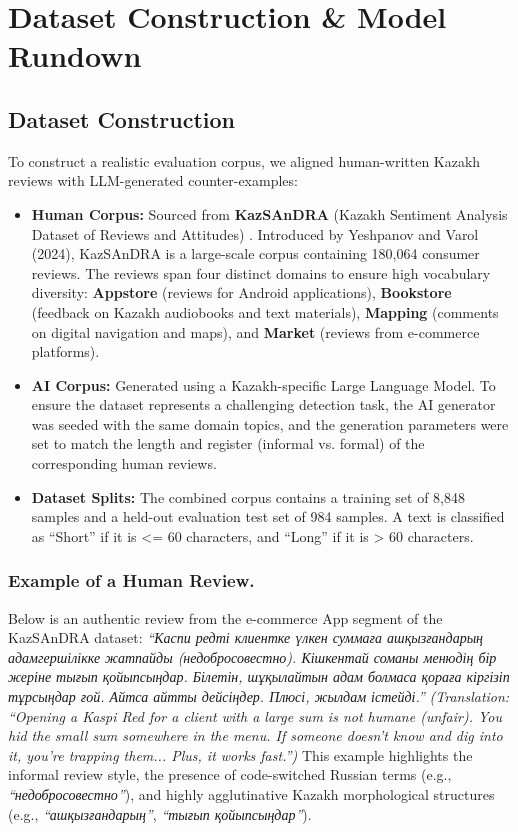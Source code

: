 \documentclass[runningheads]{llncs}
\begin{document}
\section{Dataset Construction \& Model Rundown}
\subsection{Dataset Construction}
To construct a realistic evaluation corpus, we aligned human-written Kazakh reviews with LLM-generated counter-examples:
\begin{itemize}
\item \textbf{Human Corpus:} Sourced from \textbf{KazSAnDRA} (Kazakh Sentiment Analysis Dataset of Reviews and Attitudes) \cite{1}. Introduced by Yeshpanov and Varol (2024), KazSAnDRA is a large-scale corpus containing 180,064 consumer reviews. The reviews span four distinct domains to ensure high vocabulary diversity: \textbf{Appstore} (reviews for Android applications), \textbf{Bookstore} (feedback on Kazakh audiobooks and text materials), \textbf{Mapping} (comments on digital navigation and maps), and \textbf{Market} (reviews from e-commerce platforms).
\item \textbf{AI Corpus:} Generated using a Kazakh-specific Large Language Model. To ensure the dataset represents a challenging detection task, the AI generator was seeded with the same domain topics, and the generation parameters were set to match the length and register (informal vs. formal) of the corresponding human reviews.
\item \textbf{Dataset Splits:} The combined corpus contains a training set of 8,848 samples and a held-out evaluation test set of 984 samples. A text is classified as ``Short'' if it is <= 60 characters, and ``Long'' if it is > 60 characters.
\end{itemize}

\subsubsection{Example of a Human Review.}
Below is an authentic review from the e-commerce App segment of the KazSAnDRA dataset:
\textit{``Каспи редті клиентке үлкен суммаға ашқызғандарың адамгершілікке жатпайды (недобросовестно). Кішкентай соманы менюдің бір жеріне тығып қойыпсыңдар. Білетін, шұқылайтын адам болмаса қораға кіргізіп тұрсыңдар ғой. Айтса айтты дейсіңдер. Плюсі, жылдам істейді.''}  
\textit{(Translation: ``Opening a Kaspi Red for a client with a large sum is not humane (unfair). You hid the small sum somewhere in the menu. If someone doesn't know and dig into it, you're trapping them... Plus, it works fast.'')}
This example highlights the informal review style, the presence of code-switched Russian terms (e.g., \textit{``недобросовестно''}), and highly agglutinative Kazakh morphological structures (e.g., \textit{``ашқызғандарың''}, \textit{``тығып қойыпсыңдар''}).
\end{document}
